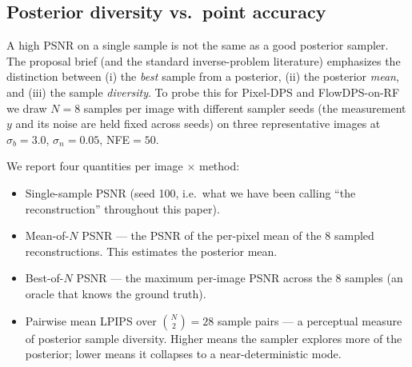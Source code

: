 \documentclass{article}
\begin{document}
\subsection{Posterior diversity vs.\ point accuracy}\label{sec:diversity}

A high PSNR on a single sample is not the same as a good posterior
sampler. The proposal brief (and the standard inverse-problem
literature) emphasizes the distinction between (i) the \emph{best}
sample from a posterior, (ii) the posterior \emph{mean}, and (iii) the
sample \emph{diversity}. To probe this for Pixel-DPS and FlowDPS-on-RF
we draw $N{=}8$ samples per image with different sampler seeds (the
measurement $y$ and its noise are held fixed across seeds) on three
representative images at $\sigma_b{=}3.0$, $\sigma_n{=}0.05$, NFE${=}50$.

We report four quantities per image $\times$ method:
\begin{itemize}[leftmargin=*,itemsep=2pt]
  \item Single-sample PSNR (seed 100, i.e.\ what we have been calling
    ``the reconstruction'' throughout this paper).
  \item Mean-of-$N$ PSNR --- the PSNR of the per-pixel mean of the 8
    sampled reconstructions. This estimates the posterior mean.
  \item Best-of-$N$ PSNR --- the maximum per-image PSNR across the 8
    samples (an oracle that knows the ground truth).
  \item Pairwise mean LPIPS over $\binom{N}{2}{=}28$ sample pairs ---
    a perceptual measure of posterior sample diversity. Higher means
    the sampler explores more of the posterior; lower means it
    collapses to a near-deterministic mode.
\end{itemize}
\end{document}
